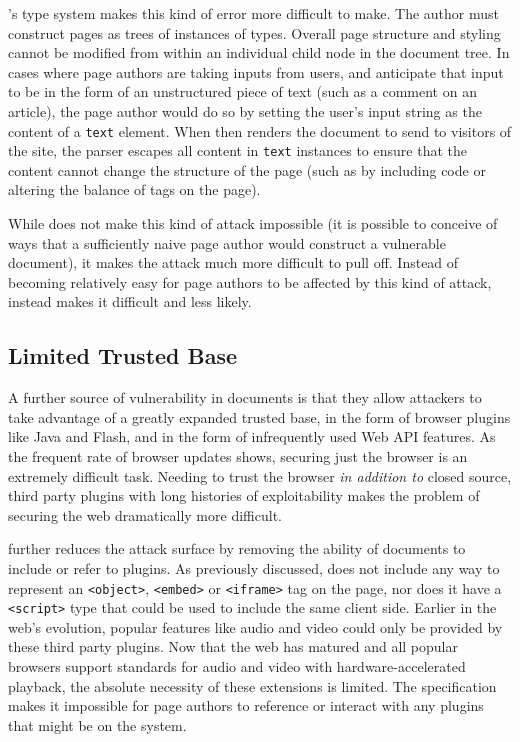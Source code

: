 \CDF's type system makes this kind of error more difficult to make.
The \CDF author must construct pages as trees of instances of types.
Overall page structure and styling cannot be modified from within
an individual child node in the document tree. In cases
where page authors are taking inputs from users, and anticipate that input
to be in the form of an unstructured piece of text (such as a comment
on an article), the page author would do so by setting the user's input string
as the content of a \texttt{text} element.  When \CDF then
renders the document to send to visitors of the site, the \CDF parser escapes all
content in \texttt{text} instances to ensure that the content cannot change
the structure of the page (such as by including \JS code or altering the balance
of tags on the page).

While \CDF does not make this kind of attack impossible (it is possible
to conceive of ways that a sufficiently naive page author would construct a
vulnerable document), it makes the attack much more difficult to pull off.
Instead of becoming relatively easy for page authors to be affected by this
kind of attack, \CDF instead makes it difficult and less likely.


\subsection{Limited Trusted Base}
A further source of vulnerability in \HTML documents is that they allow
attackers to take advantage of a greatly expanded trusted base, in the form
of browser plugins like Java and Flash, and in the form of infrequently used
Web API features.  As the frequent rate
of browser updates shows, securing just the browser is an extremely difficult
task.  Needing to trust the browser \emph{in addition to} closed source, third
party plugins with long histories of exploitability makes the problem
of securing the web dramatically more difficult.

\CDF further reduces the attack surface by removing the ability of \CDF
documents to include or refer to plugins. As previously discussed, \CDF does
not include any way to represent an \texttt{<object>}, \texttt{<embed>} or
\texttt{<iframe>} tag on the page, nor does it have a \texttt{<script>} type
that could be used to include the same client side. Earlier in the web's
evolution, popular features like audio and video could only be provided by
these third party plugins. Now that the web has matured and all popular
browsers support standards for audio and video with hardware-accelerated
playback, the absolute necessity of these extensions is limited. The \CDF
specification makes it impossible for \CDF page authors to reference or
interact with any plugins that might be on the system.

